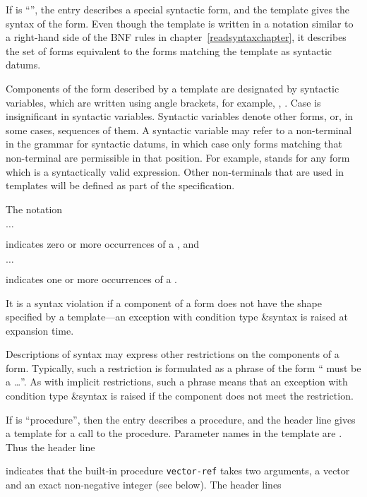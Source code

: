If  is ``\exprtype'', the entry describes a 
special syntactic form, and the template gives the syntax of the form.  Even
though the template is written in a notation similar to a right-hand
side of the BNF rules in chapter~\ref{readsyntaxchapter}, it describes
the set of forms equivalent to the forms matching the
template as syntactic datums.

Components of the form described by a template are designated
by syntactic variables, which are written using angle brackets, for
example, , .  Case is insignificant
in syntactic variables.  Syntactic variables
denote other forms, or, in some cases,
sequences of them.  A syntactic variable may refer to a non-terminal
in the grammar for syntactic datums, in which case only forms matching
that non-terminal are permissible in that position.  For example,
 stands for any form which is a
syntactically valid expression.  Other non-terminals that are used in
templates will be defined as part of the specification.

The notation
\begin{tabbing}
\qquad {} $\ldots$
\end{tabbing}
indicates zero or more occurrences of a , and
\begin{tabbing}
\qquad {}  $\ldots$
\end{tabbing}
indicates one or more occurrences of a .

It is a syntax violation if a component of a form does not have the
shape specified by a template---an exception with condition type
{\cf\&syntax} is raised at expansion time.

Descriptions of syntax may express other restrictions on the
components of a form.  Typically, such a restriction is formulated
as a phrase of the form `` must be a \ldots''.  As with
implicit restrictions, such a phrase means that an exception with
condition type {\cf\&syntax} is raised if the component does not
meet the restriction.


If  is ``procedure'', then the entry describes a procedure, and
the header line gives a template for a call to the procedure.  Parameter
names in the template are .  Thus the header line

\noindent{}\unpenalty

indicates that the built-in procedure {\tt vector-ref} takes
two arguments, a vector  and an exact non-negative integer
 (see below).  The header lines

